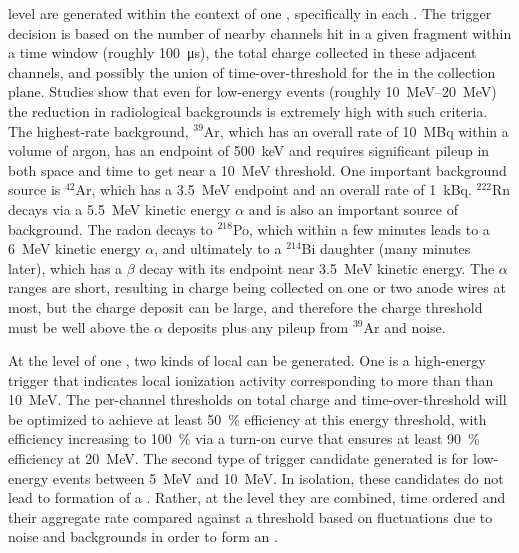  level  are generated within
the context of one , specifically in each . 
The trigger decision is based on the number of nearby channels
hit in a given fragment within a time window (roughly \SI{100}{\micro\s}),
the total charge collected in these adjacent channels, and possibly the
union of time-over-threshold for the  in the
collection plane.
Studies show that even for low-energy events (roughly
\SIrange{10}{20}{\MeV}) the reduction in radiological backgrounds is
extremely high with such criteria.
The highest-rate background, $^{39}$Ar, which has an overall rate of
\SI{10}{MBq} within a \nominalmodsize volume of argon, has an endpoint 
of \SI{500}{keV} and requires significant pileup in both space and time to get near
a \SI{10}{\MeV} threshold.
One important background source is $^{42}$Ar, which has a \SI{3.5}{MeV}
endpoint and an overall rate of \SI{1}{kBq}. 
$^{222}$Rn decays via a %
 \SI{5.5}{MeV} kinetic energy $\alpha$  and is
also an important source of background.
The radon decays to $^{218}$Po, which within a few minutes leads to a
\SI{6}{MeV} kinetic energy $\alpha$, and ultimately to a $^{214}$Bi daughter (many
minutes later), which has a $\beta$ decay with its endpoint near \SI{3.5}{MeV}  kinetic energy. 
The $\alpha$ ranges are short, resulting in charge being collected on one or two anode wires at most,
but the charge deposit can be large, and therefore the charge
threshold must be well above the $\alpha$ deposits plus any
pileup from $^{39}$Ar and noise.

At the level of one , two kinds of local
 can be generated.
One is a high-energy trigger that indicates local ionization
activity corresponding to more than than \SI{10}{\MeV}. %
The per-channel thresholds on total charge and time-over-threshold
will be optimized to achieve at least \SI{50}{\%} efficiency at this energy
threshold, with efficiency increasing to \SI{100}{\%} via a turn-on curve
that ensures at least \SI{90}{\%} efficiency at \SI{20}{\MeV}. 
The second type of trigger candidate %
generated is for
low-energy events between \SI{5}{\MeV} and \SI{10}{\MeV}. 
In isolation, these candidates do not lead to formation of a
. 
Rather, at the  level they are combined, time
ordered and their aggregate rate compared against a threshold based on
fluctuations due to noise and backgrounds in order to form an
 .

